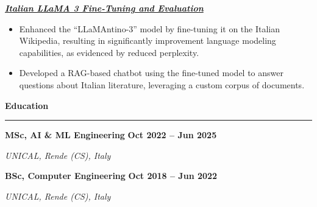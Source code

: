 \documentclass[9pt, a4paper]{article}
\newcommand{\cvsection}[1]{%
	\vspace{2pt}\par
	{\Large\bfseries\color{sectionblue}#1}\par
	\vspace{2pt}\hrule\vspace{6pt}
}
\newcommand{\cvsubsection}[3]{%
	\par {\large\bfseries #1} \hfill {\bfseries #2} \par {\textit{#3}} \vspace{4pt}
}
\newcommand{\cvproject}[1]{%
	\par {\large{\bfseries{\textit{#1}}}} \par \vspace{4pt}
}
\begin{document}
\begin{minipage}[t]{0.65\linewidth}
		\vspace{6pt}
		\cvproject{\href{https://github.com/bGuzzo/Italian-LLaMA-Project}{Italian LLaMA 3 Fine-Tuning and Evaluation}}
		\begin{itemize}[leftmargin=*, nosep]
			\item \footnotesize Enhanced the ``LLaMAntino-3'' model by fine-tuning it on the Italian Wikipedia, resulting in significantly improvement language modeling capabilities, as evidenced by reduced perplexity.
			
			\vspace{2pt}
			\item \footnotesize Developed a RAG-based chatbot using the fine-tuned model to answer questions about Italian literature, leveraging a custom corpus of documents.
		\end{itemize}
		
		\vspace{10pt}\par
		\cvsection{Education}
		
		\cvsubsection{MSc, AI \& ML Engineering}{Oct 2022 -- Jun 2025}{UNICAL, Rende (CS), Italy}
		\cvsubsection{BSc, Computer Engineering}{Oct 2018 -- Jun 2022}{UNICAL, Rende (CS), Italy}
		
	\end{minipage}%
	\hfill%
\end{document}
